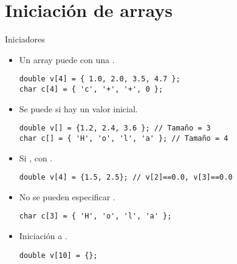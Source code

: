 \section{Iniciación de arrays}

\begin{frame}[t,fragile]{Iniciadores}
\begin{itemize}
  \item Un array puede  con una .
\begin{lstlisting}
double v[4] = { 1.0, 2.0, 3.5, 4.7 };
char c[4] = { 'c', '+', '+', 0 };
\end{lstlisting}

  \item Se puede  si hay un valor inicial.
\begin{lstlisting}
double v[] = {1.2, 2.4, 3.6 }; // Tamaño = 3
char c[] = { 'H', 'o', 'l', 'a' }; // Tamaño = 4
\end{lstlisting}

  \item Si ,  con .
\begin{lstlisting}
double v[4] = {1.5, 2.5}; // v[2]==0.0, v[3]==0.0
\end{lstlisting}

  \item No se pueden especificar .
\begin{lstlisting}
char c[3] = { 'H', 'o', 'l', 'a' };
\end{lstlisting}

  \item Iniciación a .
\begin{lstlisting}
double v[10] = {};
\end{lstlisting}
\end{itemize}
\end{frame}

